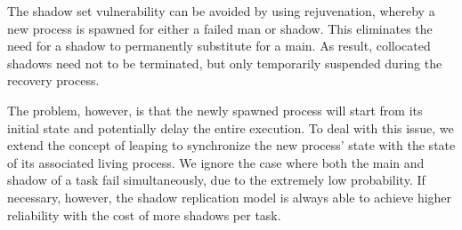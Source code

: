 

The shadow set vulnerability can be avoided by using rejuvenation, whereby a new process is spawned for either a failed man or shadow. This eliminates the need for a shadow to permanently substitute for a main. As result, collocated shadows need not to be terminated, but only temporarily suspended during the recovery process.  %

The problem, however, is that the newly spawned process will start from its initial state and potentially delay the entire execution.
To deal with this issue, we extend the concept of leaping to synchronize the new process' state with the state of its associated living process. We ignore the case where both the main and shadow of a task fail simultaneously, due to the extremely low probability. If necessary, however, the shadow replication model is always able to achieve higher reliability with the cost of more shadows per task. 



